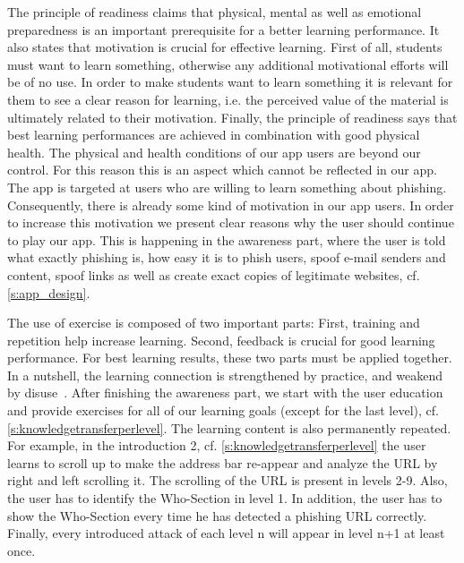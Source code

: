 \begin{description}[leftmargin=0cm]
	\item[Readiness] The principle of readiness claims that physical, mental as well as emotional preparedness is an important prerequisite for a better learning performance. 
It also states that motivation is crucial for effective learning. 
First of all, students must want to learn something, otherwise any additional motivational efforts will be of no use. 
In order to make students want to learn something it is relevant for them to see a clear reason for learning, i.e. the perceived value of the material is ultimately related to their motivation. 
Finally, the principle of readiness says that best learning performances are achieved in combination with good physical health.
The physical and health conditions of our app users are beyond our control.
For this reason this is an aspect which cannot be reflected in our app.
The app is targeted at users who are willing to learn something about phishing. 
Consequently, there is already some kind of motivation in our app users.
In order to increase this motivation we present clear reasons why the user should continue to play our app.
This is happening in the awareness part, where the user is told what exactly phishing is, how easy it is to phish users, spoof e-mail senders and content, spoof links as well as create exact copies of legitimate websites, cf. \autoref{s:app_design}.
	\item[Exercise] The use of exercise is composed of two important parts: 
First, training and repetition help increase learning. 
Second, feedback is crucial for good learning performance.
For best learning results, these two parts must be applied together.
In a nutshell, the learning connection is strengthened by practice, and weakend by disuse~\cite{handbook2008us}.
After finishing the awareness part, we start with the user education and provide exercises for all of our learning goals (except for the last level), cf. \autoref{s:knowledgetransferperlevel}.
The learning content is also permanently repeated. 
For example, in the introduction 2, cf. \autoref{s:knowledgetransferperlevel} the user learns to scroll up to make the address bar re-appear and analyze the URL by right and left scrolling it. 
The scrolling of the URL is present in levels 2-9.
Also, the user has to identify the Who-Section in level 1. 
In addition, the user has to show the Who-Section every time he has detected a phishing URL correctly.
Finally, every introduced attack of each level n will appear in level n+1 at least once. 

\end{description}
